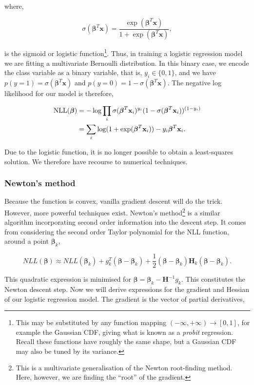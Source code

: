 \documentclass[11pt]{amsart}
\begin{document}
where,

$$\sigma(\boldsymbol\beta^T\mathbf{x}) = \frac{\exp(\boldsymbol\beta^T\mathbf{x})}{1 + \exp(\boldsymbol\beta^T\mathbf{x})},$$

is the sigmoid or logistic function\footnote{This may be substituted by any function mapping $(-\infty, +\infty) \to [0, 1]$, for example the Gaussian CDF, giving what is known as a \emph{probit} regression. Recall these functions have roughly the same shape, but a Gaussian CDF may also be tuned by its variance.}. Thus, in training a logistic regression model we are fitting a multivariate Bernoulli distribution. In this binary case, we encode the class variable as a binary variable, that is, $y_i \in \{0, 1\}$, and we have $p(y = 1) = \sigma(\boldsymbol\beta^T\mathbf{x})$ and $p(y = 0) = 1 - \sigma(\boldsymbol\beta^T\mathbf{x})$. The negative log likelihood for our model is therefore,

\begin{align}
\text{NLL}(\boldsymbol\beta) &= -\log\prod_i \sigma(\boldsymbol\beta^T\mathbf{x}_i)^{y_i}(1 - \sigma(\boldsymbol\beta^T\mathbf{x}_i))^{(1 - y_i)} \notag \\
&= \sum_i \log(1 + \exp(\boldsymbol\beta^T\mathbf{x}_i)) - y_i\boldsymbol\beta^T\mathbf{x}_i.\notag
\end{align}

Due to the logistic function, it is no longer possible to obtain a least-squares solution. We therefore have recourse to numerical techniques.

\subsubsection{Newton's method}

Because the function is convex, vanilla gradient descent will do the trick. However, more powerful techniques exist. Newton's method\footnote{This is a multivariate generalisation of the Newton root-finding method. Here, however, we are finding the ``root'' of the gradient.} is a similar algorithm incorporating second order information into the descent step. It comes from considering the second order Taylor polynomial for the NLL function, around a point $\boldsymbol\beta_k$,

$$NLL(\boldsymbol\beta) \approx NLL(\boldsymbol\beta_k) + g_k^T(\boldsymbol\beta - \boldsymbol\beta_k) + \frac{1}{2}(\boldsymbol\beta - \boldsymbol\beta_k)\mathbf{H}_k(\boldsymbol\beta - \boldsymbol\beta_k).$$

This quadratic expression is minimised for $\boldsymbol\beta = \boldsymbol\beta_k - \mathbf{H}^{-1}g_k$. This constitutes the Newton descent step. Now we will derive expressions for the gradient and Hessian of our logistic regression model. The gradient is the vector of partial derivatives,
\end{document}
